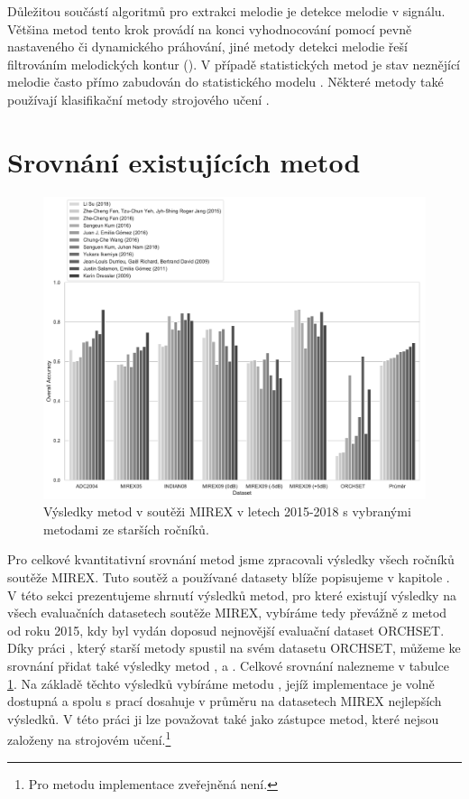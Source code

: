 Důležitou součástí algoritmů pro extrakci melodie je detekce melodie v signálu. Většina metod tento krok provádí na konci vyhodnocování pomocí pevně nastaveného či dynamického práhování, jiné metody detekci melodie řeší filtrováním melodických kontur (\cite{Salamon2012a}). V případě statistických metod je stav neznějící melodie často přímo zabudován do statistického modelu \citep{Ryynanen2008}. Některé metody také používají klasifikační metody strojového učení \citep{Rigaud2016}.

\section{Srovnání existujících metod}

\begin{figure}[h]\centering
\includegraphics[width=\textwidth,height=\textheight,keepaspectratio]{../img/mirex_results_grey}
\caption{Výsledky metod v soutěži MIREX v letech 2015-2018 s vybranými metodami ze starších ročníků.}
\label{obr:mirex_results}
\end{figure}
Pro celkové kvantitativní srovnání metod jsme zpracovali výsledky všech ročníků soutěže MIREX. Tuto soutěž a používané datasety blíže popisujeme v kapitole . V této sekci prezentujeme shrnutí výsledků metod, pro které existují výsledky na všech evaluačních datasetech soutěže MIREX, vybíráme tedy převážně z metod od roku 2015, kdy byl vydán doposud nejnovější evaluační dataset ORCHSET. Díky práci \cite{Bosch2014}, který starší metody spustil na svém datasetu ORCHSET, můžeme ke srovnání přidat také výsledky metod \cite{Dressler2009}, \cite{Salamon2012a} a \cite{Durrieu2010}. Celkové srovnání nalezneme v tabulce \ref{obr:mirex_results}. Na základě těchto výsledků vybíráme metodu \cite{Salamon2012a}, jejíž implementace je volně dostupná a spolu s prací \cite{Dressler2009} dosahuje v průměru na datasetech MIREX nejlepších výsledků. V této práci ji lze považovat také jako zástupce metod, které nejsou založeny na strojovém učení.\footnote{Pro metodu \cite{Dressler2009} implementace zveřejněná není.}

